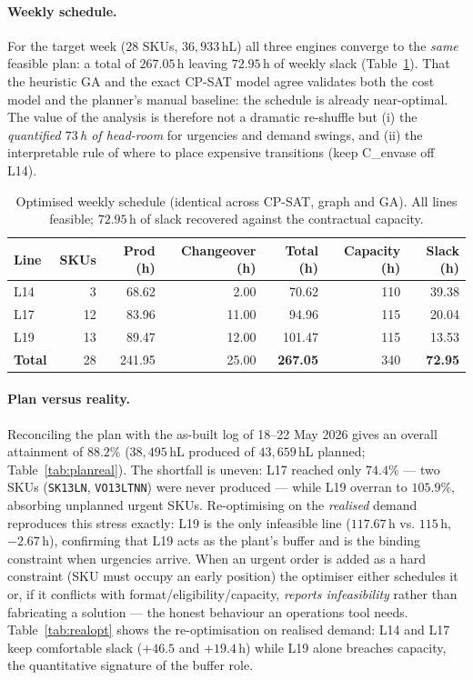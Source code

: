 \documentclass[11pt,a4paper]{article}
\begin{document}
\paragraph{Weekly schedule.}
For the target week ($28$ SKUs, $36{,}933$\,hL) all three engines converge to the
\emph{same} feasible plan: a total of $\mathbf{267.05}$\,h leaving
$\mathbf{72.95}$\,h of weekly slack (Table~\ref{tab:sched}). That the
heuristic GA and the exact CP-SAT model agree validates both the cost model and
the planner's manual baseline: the schedule is already near-optimal. The value of
the analysis is therefore not a dramatic re-shuffle but (i) the \emph{quantified
$73$\,h of head-room} for urgencies and demand swings, and (ii) the interpretable
rule of where to place expensive transitions (keep C\_envase off L14).

\begin{table}[H]\centering\small
\begin{tabular}{@{}lrrrrrr@{}}
\toprule
Line & SKUs & Prod (h) & Changeover (h) & Total (h) & Capacity (h) & Slack (h)\\
\midrule
L14 & 3  & 68.62 & 2.00  & 70.62  & 110 & 39.38 \\
L17 & 12 & 83.96 & 11.00 & 94.96  & 115 & 20.04 \\
L19 & 13 & 89.47 & 12.00 & 101.47 & 115 & 13.53 \\
\midrule
\textbf{Total} & 28 & 241.95 & 25.00 & \textbf{267.05} & 340 & \textbf{72.95}\\
\bottomrule
\end{tabular}
\caption{Optimised weekly schedule (identical across CP-SAT, graph and GA). All
lines feasible; $72.95$\,h of slack recovered against the contractual capacity.}
\label{tab:sched}
\end{table}

\paragraph{Plan versus reality.}
Reconciling the plan with the as-built log of 18--22 May 2026 gives an overall
attainment of $\mathbf{88.2\%}$ ($38{,}495$\,hL produced of $43{,}659$\,hL
planned; Table~\ref{tab:planreal}). The shortfall is uneven: L17 reached only
$74.4\%$ --- two SKUs (\texttt{SK13LN}, \texttt{VO13LTNN}) were never produced ---
while L19 overran to $105.9\%$, absorbing unplanned urgent SKUs. Re-optimising on
the \emph{realised} demand reproduces this stress exactly: L19 is the only
infeasible line ($117.67$\,h vs. $115$\,h, $-2.67$\,h), confirming that L19 acts
as the plant's buffer and is the binding constraint when urgencies arrive. When an
urgent order is added as a hard constraint (SKU must occupy an early position) the
optimiser either schedules it or, if it conflicts with format/eligibility/capacity,
\emph{reports infeasibility} rather than fabricating a solution --- the honest
behaviour an operations tool needs. Table~\ref{tab:realopt} shows the
re-optimisation on realised demand: L14 and L17 keep comfortable slack
($+46.5$ and $+19.4$\,h) while L19 alone breaches capacity, the quantitative
signature of the buffer role.
\end{document}
